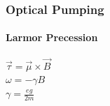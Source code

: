 \documentclass{beamer}
\begin{document}
\begin{frame}
  \frametitle{Optical Pumping}
  \framesubtitle{Larmor Precession}
	  \begin{minipage}{0.4\textwidth}
		\vspace{-5cm}
	  \begin{center}
		 $\vec \tau = \vec \mu \times \vec B $\\
	\vspace{1cm}
	   $\omega = -\gamma B$\\
	\vspace{1cm}
	   $ \gamma = \frac{eg}{2m}$
	\end{center}
  \end{minipage}
  \hfill
  \begin{minipage}[b]{0.4\textwidth}
\end{minipage}
\end{frame}
\end{document}
